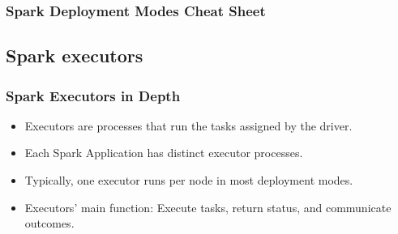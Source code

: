 \begin{frame}
    \frametitle{Spark Deployment Modes Cheat Sheet}
    \begin{table}[h!]
        \centering
        \caption{Summary of Spark deployment modes}\label{tab:spark-deployment}
    \end{table}
\end{frame}

\subsection{Spark executors}\label{subsec:spark-executors}

\begin{frame}
    \frametitle{Spark Executors in Depth}
    \begin{itemize}
        \item Executors are processes that run the tasks assigned by the driver.
        \item Each Spark Application has distinct executor processes.
        \item Typically, one executor runs per node in most deployment modes.
        \item Executors' main function: Execute tasks, return status, and communicate outcomes.
    \end{itemize}
\end{frame}

